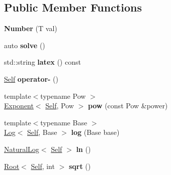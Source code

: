\subsection*{Public Member Functions}
\begin{DoxyCompactItemize}
\item 
\hypertarget{classlatex_1_1math_1_1Number_ad95c73319da794a949d07258f3cd23f3}{{\bfseries Number} (T val)}\label{classlatex_1_1math_1_1Number_ad95c73319da794a949d07258f3cd23f3}

\item 
\hypertarget{classlatex_1_1math_1_1Number_a828245764da36255de6fc5de3ff419cf}{auto {\bfseries solve} ()}\label{classlatex_1_1math_1_1Number_a828245764da36255de6fc5de3ff419cf}

\item 
\hypertarget{classlatex_1_1math_1_1Number_a4ba49b934f893e3582f755a2830cc9f5}{std\-::string {\bfseries latex} () const }\label{classlatex_1_1math_1_1Number_a4ba49b934f893e3582f755a2830cc9f5}

\item 
\hypertarget{classlatex_1_1math_1_1Number_a8ab91d58fe8e6708b72d53fb0266b9c9}{\hyperlink{classlatex_1_1math_1_1Number}{Self} {\bfseries operator-\/} ()}\label{classlatex_1_1math_1_1Number_a8ab91d58fe8e6708b72d53fb0266b9c9}

\item 
\hypertarget{classlatex_1_1math_1_1Number_aa2f067bcad6aa2afd7fb83faea74336a}{{\footnotesize template$<$typename Pow $>$ }\\\hyperlink{classlatex_1_1math_1_1Exponent}{Exponent}$<$ \hyperlink{classlatex_1_1math_1_1Number}{Self}, Pow $>$ {\bfseries pow} (const Pow \&power)}\label{classlatex_1_1math_1_1Number_aa2f067bcad6aa2afd7fb83faea74336a}

\item 
\hypertarget{classlatex_1_1math_1_1Number_af8ac2784e513ee0761c9a42972fc9744}{{\footnotesize template$<$typename Base $>$ }\\\hyperlink{classlatex_1_1math_1_1Log}{Log}$<$ \hyperlink{classlatex_1_1math_1_1Number}{Self}, Base $>$ {\bfseries log} (Base base)}\label{classlatex_1_1math_1_1Number_af8ac2784e513ee0761c9a42972fc9744}

\item 
\hypertarget{classlatex_1_1math_1_1Number_a5a808cf6ecbb48144d85cad64def6b42}{\hyperlink{classlatex_1_1math_1_1NaturalLog}{Natural\-Log}$<$ \hyperlink{classlatex_1_1math_1_1Number}{Self} $>$ {\bfseries ln} ()}\label{classlatex_1_1math_1_1Number_a5a808cf6ecbb48144d85cad64def6b42}

\item 
\hypertarget{classlatex_1_1math_1_1Number_a41e6361f370fe20ed6bf147807d8edb3}{\hyperlink{classlatex_1_1math_1_1Root}{Root}$<$ \hyperlink{classlatex_1_1math_1_1Number}{Self}, int $>$ {\bfseries sqrt} ()}\label{classlatex_1_1math_1_1Number_a41e6361f370fe20ed6bf147807d8edb3}

\end{DoxyCompactItemize}
